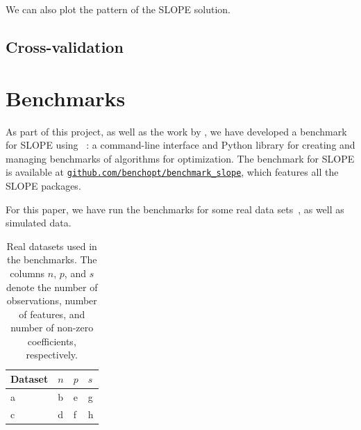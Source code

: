 \documentclass[article]{jss}
\let\Cref\crtCref
\newcommand{\myurl}[1]{\href{https://#1}{\nolinkurl{#1}}}
\begin{document}
We can also plot the pattern of the SLOPE solution.


\subsection{Cross-validation}

\section{Benchmarks}

As part of this project, as well as the work by \citet{larsson2023}, we have
developed a benchmark for SLOPE using ~\citep{moreau2022a}: a
command-line interface and Python library for creating and managing
benchmarks of algorithms for optimization. The benchmark for
SLOPE is available at \myurl{github.com/benchopt/benchmark\_slope}, which
features all the SLOPE packages.

For this paper, we have run the benchmarks for some real data sets~\Cref{tab:real-datasets},
as well as simulated data.

\begin{table}[t]
  \centering
  \label{tab:real-datasets}
  \begin{tabular}{llll}
    \toprule
    Dataset & \(n\) & \(p\) & \(s\) \\
    \midrule
    a       & b     & e     & g     \\
    c       & d     & f     & h     \\
    \bottomrule
  \end{tabular}
  \caption{
    Real datasets used in the benchmarks. The columns \(n\), \(p\), and \(s\)
    denote the number of observations, number of features, and number of
    non-zero coefficients, respectively.
  }
\end{table}
\end{document}
